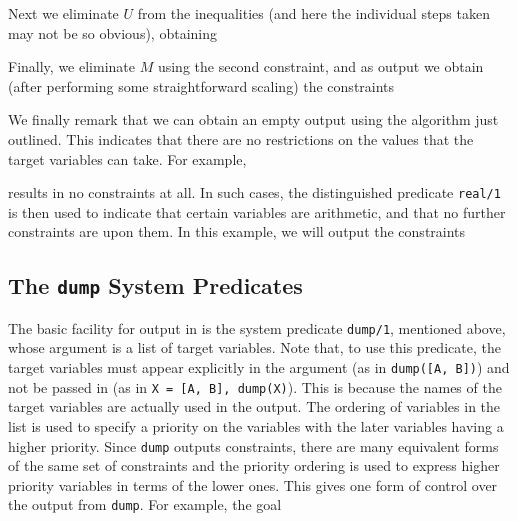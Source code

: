 \noindent
Next we eliminate $U$ from the inequalities
(and here the individual steps taken may not
be so obvious), obtaining


\noindent
Finally, we eliminate $M$ using the second constraint, and as output
we obtain (after performing some straightforward scaling) the constraints


\noindent
We finally remark that we can obtain an empty
output using the algorithm just outlined.  This indicates
that there are no restrictions on the values that the target
variables can take.  For example,


\noindent
results in no constraints at all.  In such cases, 
the distinguished predicate {\tt real/1}
is then used to indicate that certain variables are arithmetic,
and that no further constraints are upon them.
In this example, we will output the constraints


\subsection{The {\tt dump} System Predicates}
\label{dump-preds}

The basic facility for output in \CLPR{} is the system
predicate {\tt dump/1}, mentioned above, whose argument is a list of
target variables.  
Note that, to use this predicate, the
target variables must appear explicitly in the argument
(as in {\tt dump([A, B])}) and not be passed in
(as in {\tt X = [A, B], dump(X)}).  
This is because the names of the target variables
are actually used in the output. 
The ordering of variables in the list is used to specify a priority
on the variables with the later variables having a higher priority.
Since {\tt dump} outputs constraints, there are many equivalent
forms of the same set of constraints and the priority ordering is
used to express higher priority variables in terms of the lower ones.
This gives one form of control over the output from {\tt dump}.
For example, the goal

